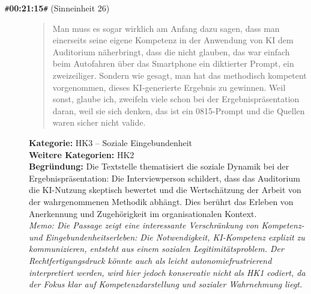 \begin{description}
  \item[\texttt{\#}\textbf{00:21:15}\texttt{\#} (Sinneinheit 26)]
  \begin{quote}
  Man muss es sogar wirklich am Anfang dazu sagen, dass man einerseits seine eigene Kompetenz in der Anwendung von KI dem Auditorium näherbringt, dass die nicht glauben, das war einfach beim Autofahren über das Smartphone ein diktierter Prompt, ein zweizeiliger. Sondern wie gesagt, man hat das methodisch kompetent vorgenommen, dieses KI-generierte Ergebnis zu gewinnen. Weil sonst, glaube ich, zweifeln viele schon bei der Ergebnispräsentation daran, weil sie sich denken, das ist ein 0815-Prompt und die Quellen waren sicher nicht valide.
  \end{quote}
  \textbf{Kategorie:} HK3 -- Soziale Eingebundenheit\\
  \textbf{Weitere Kategorien:} HK2\\
  \textbf{Begr\"undung:} Die Textstelle thematisiert die soziale Dynamik bei der Ergebnispräsentation: Die Interviewperson schildert, dass das Auditorium die KI-Nutzung skeptisch bewertet und die Wertschätzung der Arbeit von der wahrgenommenen Methodik abhängt. Dies berührt das Erleben von Anerkennung und Zugehörigkeit im organisationalen Kontext.
  \\\textit{Memo: Die Passage zeigt eine interessante Verschränkung von Kompetenz- und Eingebundenheitserleben: Die Notwendigkeit, KI-Kompetenz explizit zu kommunizieren, entsteht aus einem sozialen Legitimitätsproblem. Der Rechtfertigungsdruck könnte auch als leicht autonomiefrustrierend interpretiert werden, wird hier jedoch konservativ nicht als HK1 codiert, da der Fokus klar auf Kompetenzdarstellung und sozialer Wahrnehmung liegt.}
\end{description}
\medskip

